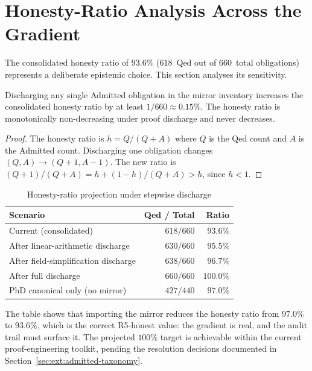 \section{Honesty-Ratio Analysis Across the Gradient}
\label{sec:ext:honesty}

The consolidated honesty ratio of $93.6\%$ ($618$~Qed out of
$660$~total obligations) represents a deliberate epistemic choice. This
section analyses its sensitivity.

\begin{theorem}
  \label{thm:honesty-monotone}
  Discharging any single Admitted obligation in the mirror inventory
  increases the consolidated honesty ratio by at least
  $1/660 \approx 0.15\%$. The honesty ratio is monotonically
  non-decreasing under proof discharge and never decreases.
\end{theorem}

\begin{proof}
  The honesty ratio is $h = Q / (Q + A)$ where $Q$ is the Qed count
  and $A$ is the Admitted count. Discharging one obligation changes
  $(Q, A) \to (Q+1, A-1)$. The new ratio is
  $(Q+1)/(Q+A) = h + (1-h)/(Q+A) > h$, since $h < 1$.
\end{proof}

\begin{table}[h]
\centering
\caption{Honesty-ratio projection under stepwise discharge}
\label{tab:honesty-proj}
\begin{tabular}{lrr}
\toprule
\textbf{Scenario} & \textbf{Qed / Total} & \textbf{Ratio} \\
\midrule
Current (consolidated)             & $618 / 660$ & $93.6\%$ \\
After linear-arithmetic discharge   & $630 / 660$ & $95.5\%$ \\
After field-simplification discharge & $638 / 660$ & $96.7\%$ \\
After full discharge                & $660 / 660$ & $100.0\%$ \\
\midrule
PhD canonical only (no mirror)     & $427 / 440$ & $97.0\%$ \\
\bottomrule
\end{tabular}
\end{table}

The table shows that importing the mirror reduces the honesty ratio
from $97.0\%$ to $93.6\%$, which is the correct R5-honest value: the
gradient is real, and the audit trail must surface it. The projected
$100\%$ target is achievable within the current proof-engineering
toolkit, pending the resolution decisions documented in
Section~\ref{sec:ext:admitted-taxonomy}.

